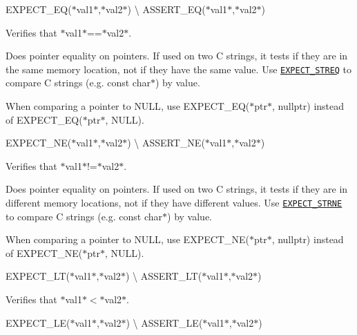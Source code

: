 {\ttfamily E\+X\+P\+E\+C\+T\+\_\+\+EQ(}$\ast${\ttfamily val1}$\ast${\ttfamily ,}$\ast${\ttfamily val2}$\ast${\ttfamily )} \textbackslash{} {\ttfamily A\+S\+S\+E\+R\+T\+\_\+\+EQ(}$\ast${\ttfamily val1}$\ast${\ttfamily ,}$\ast${\ttfamily val2}$\ast${\ttfamily )}

Verifies that $\ast${\ttfamily val1}$\ast${\ttfamily ==}$\ast${\ttfamily val2}$\ast$.

Does pointer equality on pointers. If used on two C strings, it tests if they are in the same memory location, not if they have the same value. Use \href{#EXPECT_STREQ}{\tt {\ttfamily E\+X\+P\+E\+C\+T\+\_\+\+S\+T\+R\+EQ}} to compare C strings (e.\+g. {\ttfamily const char$\ast$}) by value.

When comparing a pointer to {\ttfamily N\+U\+LL}, use {\ttfamily E\+X\+P\+E\+C\+T\+\_\+\+EQ(}$\ast${\ttfamily ptr}$\ast${\ttfamily , nullptr)} instead of {\ttfamily E\+X\+P\+E\+C\+T\+\_\+\+EQ(}$\ast${\ttfamily ptr}$\ast${\ttfamily , N\+U\+LL)}.

{\ttfamily E\+X\+P\+E\+C\+T\+\_\+\+NE(}$\ast${\ttfamily val1}$\ast${\ttfamily ,}$\ast${\ttfamily val2}$\ast${\ttfamily )} \textbackslash{} {\ttfamily A\+S\+S\+E\+R\+T\+\_\+\+NE(}$\ast${\ttfamily val1}$\ast${\ttfamily ,}$\ast${\ttfamily val2}$\ast${\ttfamily )}

Verifies that $\ast${\ttfamily val1}$\ast${\ttfamily !=}$\ast${\ttfamily val2}$\ast$.

Does pointer equality on pointers. If used on two C strings, it tests if they are in different memory locations, not if they have different values. Use \href{#EXPECT_STRNE}{\tt {\ttfamily E\+X\+P\+E\+C\+T\+\_\+\+S\+T\+R\+NE}} to compare C strings (e.\+g. {\ttfamily const char$\ast$}) by value.

When comparing a pointer to {\ttfamily N\+U\+LL}, use {\ttfamily E\+X\+P\+E\+C\+T\+\_\+\+NE(}$\ast${\ttfamily ptr}$\ast${\ttfamily , nullptr)} instead of {\ttfamily E\+X\+P\+E\+C\+T\+\_\+\+NE(}$\ast${\ttfamily ptr}$\ast${\ttfamily , N\+U\+LL)}.

{\ttfamily E\+X\+P\+E\+C\+T\+\_\+\+LT(}$\ast${\ttfamily val1}$\ast${\ttfamily ,}$\ast${\ttfamily val2}$\ast${\ttfamily )} \textbackslash{} {\ttfamily A\+S\+S\+E\+R\+T\+\_\+\+LT(}$\ast${\ttfamily val1}$\ast${\ttfamily ,}$\ast${\ttfamily val2}$\ast${\ttfamily )}

Verifies that $\ast${\ttfamily val1}$\ast${\ttfamily $<$}$\ast${\ttfamily val2}$\ast$.

{\ttfamily E\+X\+P\+E\+C\+T\+\_\+\+LE(}$\ast${\ttfamily val1}$\ast${\ttfamily ,}$\ast${\ttfamily val2}$\ast${\ttfamily )} \textbackslash{} {\ttfamily A\+S\+S\+E\+R\+T\+\_\+\+LE(}$\ast${\ttfamily val1}$\ast${\ttfamily ,}$\ast${\ttfamily val2}$\ast${\ttfamily )}

